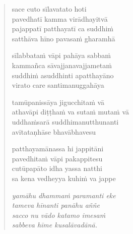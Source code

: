 \clearpage
\begin{verse}

sace cuto sīlavatato hoti\\
pavedhatī kamma virādhayitvā\\
pajappatī patthayatī ca suddhiṁ\\
satthāva hīno pavasaṁ gharamhā

sīlabbataṁ vāpi pahāya sabbaṁ\\
kammañca sāvajjanavajjametaṁ\\
suddhiṁ asuddhinti apatthayāno\\
virato care santimanuggahāya

tamūpanissāya jigucchitaṁ vā\\
athavāpi diṭṭhaṁ va sutaṁ mutaṁ vā\\
uddhaṁsarā suddhimanutthunanti\\
avītataṇhāse bhavābhavesu

patthayamānassa hi jappitāni\\
pavedhitaṁ vāpi pakappitesu\\
cutūpapāto idha yassa natthi\\
sa kena vedheyya kuhiṁ va jappe

\emph{yamāhu dhammaṁ paramanti eke\\
tameva hīnanti panāhu aññe}\\
\emph{sacco nu vādo katamo imesaṁ\\
sabbeva hīme kusalāvadānā.}

\end{verse}


